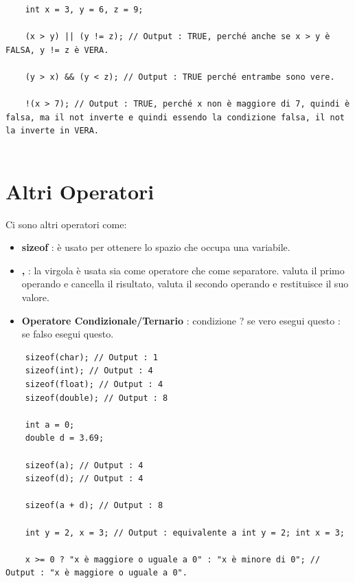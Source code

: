 \begin{lstlisting}
	int x = 3, y = 6, z = 9;
	
	(x > y) || (y != z); // Output : TRUE, perché anche se x > y è FALSA, y != z è VERA.
	
	(y > x) && (y < z); // Output : TRUE perché entrambe sono vere.
	
	!(x > 7); // Output : TRUE, perché x non è maggiore di 7, quindi è falsa, ma il not inverte e quindi essendo la condizione falsa, il not la inverte in VERA.
	
\end{lstlisting}


\section{Altri Operatori}

\textsf{\small Ci sono altri operatori come: } \\

\begin{itemize}
	\item \textsf{\small \textbf{sizeof} : è usato per ottenere lo spazio che occupa una variabile.}
	\item \textsf{\small \textbf{,} : la virgola è usata sia come operatore che come separatore. valuta il primo operando e cancella il risultato, valuta il secondo operando e restituisce il suo valore.}
	\item \textsf{\small \textbf{Operatore Condizionale/Ternario} : condizione ? se vero esegui questo : se falso esegui questo.}
\end{itemize}

\begin{lstlisting}
	sizeof(char); // Output : 1
	sizeof(int); // Output : 4
	sizeof(float); // Output : 4
	sizeof(double); // Output : 8
	
	int a = 0;
	double d = 3.69;
	
	sizeof(a); // Output : 4
	sizeof(d); // Output : 4
	
	sizeof(a + d); // Output : 8
	
	int y = 2, x = 3; // Output : equivalente a int y = 2; int x = 3;
	
	x >= 0 ? "x è maggiore o uguale a 0" : "x è minore di 0"; // Output : "x è maggiore o uguale a 0".
\end{lstlisting}

